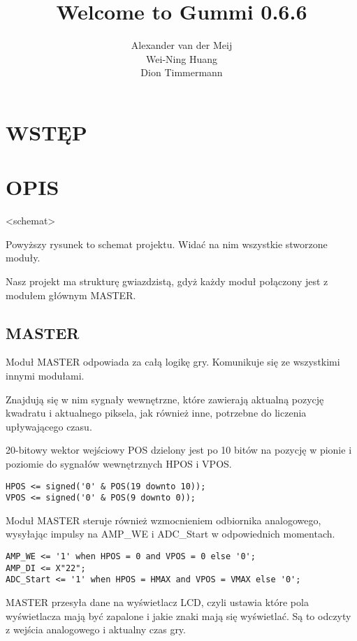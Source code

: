 \documentclass[11pt]{article}
\title{\textbf{Welcome to Gummi 0.6.6}}
\author{Alexander van der Meij\\
		Wei-Ning Huang\\
		Dion Timmermann}
\date{}
\begin{document}
\maketitle

\section{WSTĘP}

\section{OPIS}

<schemat>

Powyższy rysunek to schemat projektu.
Widać na nim wszystkie stworzone moduły.

Nasz projekt ma strukturę gwiazdzistą, gdyż każdy moduł połączony jest z modułem głównym MASTER.

\subsection{MASTER}

Moduł MASTER odpowiada za całą logikę gry.
Komunikuje się ze wszystkimi innymi modułami.

Znajdują się w nim sygnały wewnętrzne, które zawierają aktualną pozycję kwadratu i aktualnego piksela, jak również inne, potrzebne do liczenia upływającego czasu.

20-bitowy wektor wejściowy POS dzielony jest po 10 bitów na pozycję w pionie i poziomie do sygnałów wewnętrznych HPOS i VPOS.

\begin{lstlisting}
HPOS <= signed('0' & POS(19 downto 10));
VPOS <= signed('0' & POS(9 downto 0));
\end{lstlisting}

Moduł MASTER steruje również wzmocnieniem odbiornika analogowego, wysyłając impulsy na AMP\_WE i ADC\_Start w odpowiednich momentach.

\begin{lstlisting}
AMP_WE <= '1' when HPOS = 0 and VPOS = 0 else '0';
AMP_DI <= X"22";
ADC_Start <= '1' when HPOS = HMAX and VPOS = VMAX else '0';
\end{lstlisting}

MASTER przesyła dane na wyświetlacz LCD, czyli ustawia które pola wyświetlacza mają być zapalone i jakie znaki mają się wyświetlać.
Są to odczyty z wejścia analogowego i aktualny czas gry.
\end{document}
